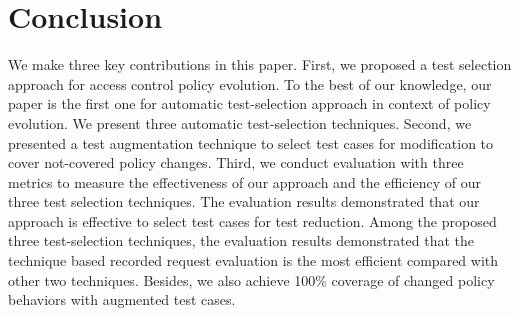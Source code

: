\section{Conclusion}
\label{sec:conclusion}

We make three key contributions in this paper. First, we
proposed a test selection approach for
access control policy evolution.
To the best of our knowledge,
our paper is the first one for automatic test-selection approach in context of policy
evolution.
We present three automatic test-selection techniques.
Second, we presented a test augmentation technique to
select test cases for modification to cover not-covered
policy changes. Third, we conduct
evaluation with three metrics
to measure the effectiveness of our approach
and the efficiency of our three test selection
techniques.
The evaluation results demonstrated that our approach is effective to select
test cases for test reduction.
Among the proposed three test-selection techniques, the evaluation results demonstrated that the technique based recorded
request evaluation is the most efficient compared with other
two techniques. Besides, we also achieve 100\% coverage
of changed policy behaviors with augmented test cases.




%
%
%
%
%
%
